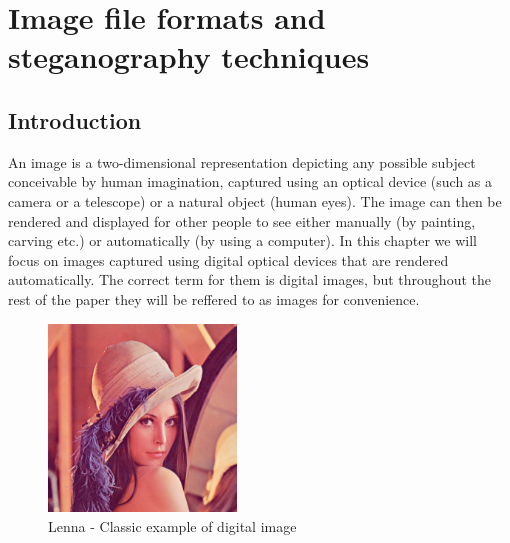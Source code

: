 
\chapter{Image file formats and steganography techniques}

\section{Introduction}

\setlength\columnsep{20pt}
\begin{multicols*}{2}
An image is a two-dimensional representation depicting any possible subject conceivable by human imagination, captured using an optical device (such as a camera or a telescope) or a natural object (human eyes). The image can then be rendered and displayed for other people to see either manually (by painting, carving etc.) or automatically (by using a computer). In this chapter we will focus on images captured using digital optical devices that are rendered automatically. The correct term for them is digital images, but throughout the rest of the paper they will be reffered to as images for convenience.

\begin{figure}[H]
    \centering
    \includegraphics[width=5cm,height=5cm,keepaspectratio]{pics/lenna}
    \caption{Lenna - Classic example of digital image}
    \label{Lenna}
\end{figure}


\end{multicols*}
